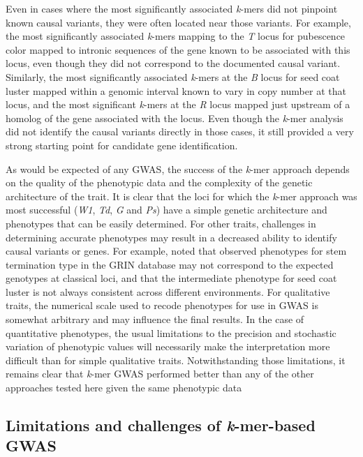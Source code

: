 Even in cases where the most significantly associated \emph{k}-mers did not
pinpoint known causal variants, they were often located near
those variants. For example, the most significantly associated \emph{k}-mers
mapping to the \emph{T} locus for pubescence color mapped to intronic sequences
of the gene known to be associated with this locus, even though they did not
correspond to the documented causal variant. Similarly, the most significantly associated
\emph{k}-mers at the \emph{B} locus for seed coat luster mapped within a
genomic interval known to vary in copy number at that locus, and the most
significant \emph{k}-mers at the \emph{R} locus mapped just upstream of a
homolog of the gene associated with the locus. Even though the \emph{k}-mer
analysis did not identify the causal variants directly in those cases, it still
provided a very strong starting point for candidate gene identification.

As would be expected of any GWAS, the success of the \emph{k}-mer approach
depends on the quality of the phenotypic data and the complexity of the genetic
architecture of the trait. It is clear that the loci for which the
\emph{k}-mer approach was most successful (\emph{W1}, \emph{Td}, \emph{G} and
\emph{Ps}) have a simple genetic architecture and phenotypes that can be easily
determined. For other traits, challenges in determining accurate phenotypes may
result in a decreased ability to identify causal variants or genes. For
example, \cite{bandillo2017} noted that observed phenotypes for stem
termination type in the GRIN database may not correspond to the expected
genotypes at classical loci, and that the intermediate phenotype for seed coat
luster is not always consistent across different environments. For qualitative
traits, the numerical scale used to recode phenotypes for use in GWAS is somewhat
arbitrary and may influence the final results. In the case of quantitative
phenotypes, the usual limitations to the precision and stochastic variation of
phenotypic values will necessarily make the interpretation more difficult than
for simple qualitative traits. Notwithstanding those limitations, it remains
clear that \textit{k}-mer GWAS performed better than any of the other
approaches tested here given the same phenotypic data

\subsection*{Limitations and challenges of \emph{k}-mer-based GWAS}
\label{limitations-of-kmers-GWAS}

